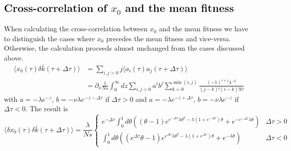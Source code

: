 \documentclass[prl,preprint]{revtex4}
\newcommand{\x}{x}
\newcommand{\dx}{\delta \x}
\newcommand{\dk}{\delta \bar{k}}
\newcommand{\la}{\langle}
\newcommand{\ra}{\rangle}
\begin{document}
\subsection*{Cross-correlation of $\x_0$ and the mean fitness}
When calculating the cross-correlation between $\x_0$ and the mean fitness we have to distinguish the cases where $\x_0$ precedes the mean fitness and vice-versa. Otherwise, the calculation proceeds almost unchanged from the cases discussed above.
\begin{equation}
\begin{split}
\la \x_0(\tau) \dk(\tau+\Delta\tau) \ra &= \sum_{i,j>0} j \la a_i(\tau)a_j(\tau+\Delta\tau)\ra \\
&= \partial_\nu \frac{1}{Ns} \int_0^\infty dz \sum_{i,j>0} a^i b^j\sum_{k=0}^{\min(i,j)} \frac{(-1)^{i+j}\lambda^{-k}}{(j-k)!(i-k)!k!}
\end{split}
\end{equation}
with $a=-\lambda e^{-z}$, $b=-\nu \lambda e^{-z-\Delta\tau}$ if $\Delta\tau>0$ and $a=-\lambda e^{-z+\Delta\tau}$, $b=-\nu \lambda e^{-z}$ if $\Delta\tau<0$. The result is 
\begin{equation}
\langle \dx_0(\tau) \dk(\tau+\Delta\tau)\rangle   = \frac{\lambda}{Ns} \begin{cases} 
  e^{-\Delta\tau} \int_0^1 d\theta \left((\theta-1)e^{e^{-\Delta\tau}\lambda \theta^2-\lambda(1+e^{-\Delta\tau}) \theta}+ e^{-e^{-\Delta\tau}\lambda \theta}\right) & \Delta\tau >0 \\
 \int_0^1 d\theta \left((e^{\Delta\tau} \theta-1)e^{e^{\Delta\tau}\lambda \theta^2-\lambda(1+e^{\Delta\tau}) \theta}+e^{-\lambda \theta}\right) & \Delta\tau <0 
\end{cases}
\end{equation}
\end{document}
